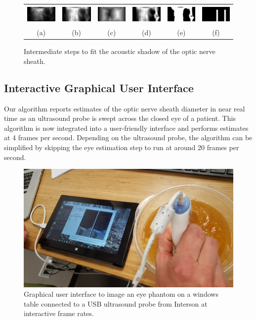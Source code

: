 \documentclass{llncs}
\begin{document}
\begin{figure}
\centering
\begin{tabular}{cccccc}
\includegraphics[height=0.36in]{019-nerve.png} &
\includegraphics[height=0.37in]{019-nerve-smooth.png} &
\includegraphics[height=0.36in]{019-nerve-distance.png} &
\includegraphics[height=0.36in]{019-nerve-scaled.png} &
\includegraphics[height=0.36in]{019-nerve-thres.png} &         
\includegraphics[height=0.36in]{019-nerve-moving.png} \\         
(a) & (b) & (c) & (d) & (e) & (f)
\end{tabular}
\caption{
\label{fig:algorithm-nerve}
Intermediate steps to fit the acoustic shadow of the optic nerve sheath.
}
\end{figure}

\subsection{Interactive Graphical User Interface}
Our algorithm reports estimates of the optic nerve sheath diameter in near real
time as an ultrasound probe is swept across the closed eye of a patient. 
This algorithm is now integrated into a user-friendly interface and performs
estimates at 4 frames per second. Depending on the ultrasound probe, the
algorithm can be simplified by skipping the eye estimation step to run at
around 20 frames per second.
\begin{figure}
\centering
\includegraphics[width=0.85\linewidth]{gui.jpg} 
\caption{
\label{fig:gui}
Graphical user interface to image an eye phantom on a windows table connected to
a USB ultrasound probe from Interson at interactive frame rates. 
}
\end{figure}
\end{document}
